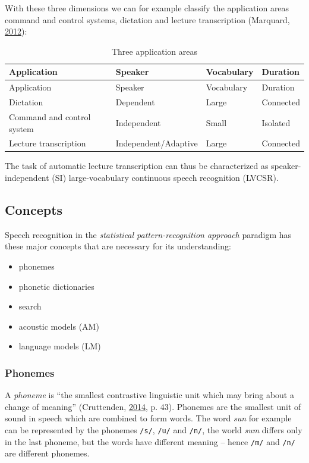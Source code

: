 \documentclass[]{article}
\providecommand{\tightlist}{%
  \setlength{\itemsep}{0pt}\setlength{\parskip}{0pt}}
\begin{document}
With these three dimensions we can for example classify the application
areas command and control systems, dictation and lecture transcription
(Marquard, \hyperref[ref-marquard]{2012}):

\begin{longtable}[c]{@{}llll@{}}
\caption{Three application areas}\tabularnewline
\toprule
Application & Speaker & Vocabulary & Duration\tabularnewline
\midrule
\endfirsthead
\toprule
Application & Speaker & Vocabulary & Duration\tabularnewline
\midrule
\endhead
Dictation & Dependent & Large & Connected\tabularnewline
Command and control system & Independent & Small &
Isolated\tabularnewline
Lecture transcription & Independent/Adaptive & Large &
Connected\tabularnewline
\bottomrule
\end{longtable}

The task of automatic lecture transcription can thus be characterized as
speaker-independent (SI) large-vocabulary continuous speech recognition
(LVCSR).

\subsection{Concepts}\label{concepts}

Speech recognition in the \emph{statistical pattern-recognition
approach} paradigm has these major concepts that are necessary for its
understanding:

\begin{itemize}
\tightlist
\item
  phonemes
\item
  phonetic dictionaries
\item
  search
\item
  acoustic models (AM)
\item
  language models (LM)
\end{itemize}

\subsubsection{Phonemes}\label{phonemes}

A \emph{phoneme} is ``the smallest contrastive linguistic unit which may
bring about a change of meaning'' (Cruttenden,
\hyperref[ref-cruttenden2014gimson]{2014}, p. 43). Phonemes are the
smallest unit of sound in speech which are combined to form words. The
word \emph{sun} for example can be represented by the phonemes
\texttt{/s/}, \texttt{/u/} and \texttt{/n/}, the world \emph{sum}
differs only in the last phoneme, but the words have different meaning
-- hence \texttt{/m/} and \texttt{/n/} are different phonemes.
\end{document}
